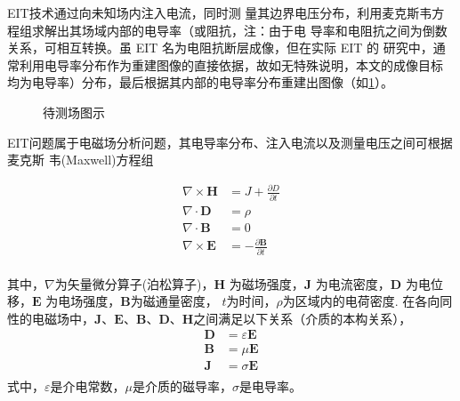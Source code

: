 EIT技术通过向未知场内注入电流，同时测
量其边界电压分布，利用麦克斯韦方程组求解出其场域内部的电导率（或阻抗，注：由于电
导率和电阻抗之间为倒数关系，可相互转换。虽 EIT 名为电阻抗断层成像，但在实际 EIT 的
研究中，通常利用电导率分布作为重建图像的直接依据，故如无特殊说明，本文的成像目标
均为电导率）分布，最后根据其内部的电导率分布重建出图像（如\cref{figure:eeeee}）。

\begin{figure}[h]
  \label{figure:eeeee}
  \centering

\caption{待测场图示}

\end{figure}



EIT问题属于电磁场分析问题，其电导率分布、注入电流以及测量电压之间可根据麦克斯
韦(Maxwell)方程组

\begin{equation}
\label{equation:Maxwell}
    \begin{aligned}
        \nabla \times \boldsymbol{H} &= J + \frac{\partial{D}}{\partial{t}} \\
        \nabla \cdot \boldsymbol{D} &= \rho \\
        \nabla \cdot \boldsymbol{B} &= 0 \\
        \nabla \times\boldsymbol{E} &= -\frac{\partial \boldsymbol{B}}{\partial t} \\   
    \end{aligned}
\end{equation}

其中，$\nabla$为矢量微分算子(泊松算子)，$\boldsymbol{H}$ 为磁场强度，$\boldsymbol{J}$ 为电流密度，$\boldsymbol{D}$
为电位移，$\boldsymbol{E}$ 为电场强度，$\boldsymbol{B}$为磁通量密度， $t$为时间，$\rho$为区域内的电荷密度.
在各向同性的电磁场中，$\boldsymbol{J}$、$\boldsymbol{E}$、$\boldsymbol{B}$、$\boldsymbol{D}$、$\boldsymbol{H}$之间满足以下关系（介质的本构关系），
\begin{equation}
  \label{equation:Maxwell_relation}
  \begin{aligned}
    \boldsymbol{D} &= \varepsilon\boldsymbol{E}\\
    \boldsymbol{B} & = \mu\boldsymbol{E}\\
    \boldsymbol{J} & = \sigma\boldsymbol{E}\\
  \end{aligned}
\end{equation}
式中，$\varepsilon$是介电常数，$\mu$是介质的磁导率，$\sigma$是电导率。


